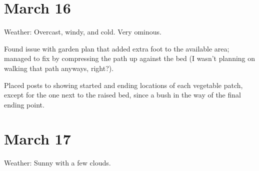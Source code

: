 \documentclass{article}
\begin{document}
\section*{March 16}
Weather: Overcast, windy, and cold. Very ominous.

Found issue with garden plan that added extra foot to the available area; managed to fix by compressing the path up against the bed (I wasn't planning on walking that path anyways, right?).

Placed posts to showing started and ending locations of each vegetable patch, except for the one next to the raised bed, since a bush in the way of the final ending point.

\section*{March 17}
Weather: Sunny with a few clouds.
\end{document}
